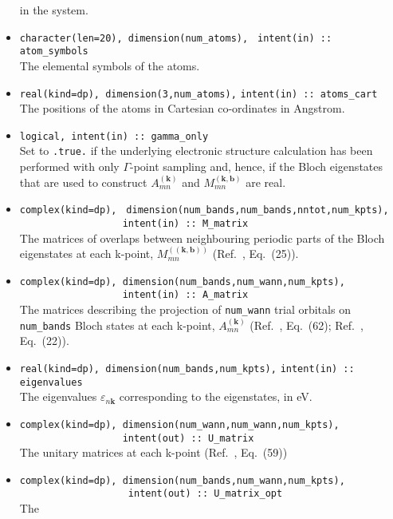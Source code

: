 \begin{itemize}
  in the system.
\item \verb#character(len=20), dimension(num_atoms),#
      \verb# intent(in) :: atom_symbols#\\ The elemental symbols of
      the atoms.
\item \verb#real(kind=dp), dimension(3,num_atoms),#
      \verb#intent(in) :: atoms_cart#\\ The positions of the atoms in
      Cartesian co-ordinates in Angstrom.
\item \verb#logical, intent(in) :: gamma_only#\\ Set to \texttt{.true.} if the
  underlying electronic structure calculation has been performed with
  only $\Gamma$-point sampling and, hence, if the Bloch eigenstates
  that are used to construct $A_{mn}^{(\mathbf{k})}$ and
  $M_{mn}^{\mathbf{(k,b)}}$ are real.
\item \verb#complex(kind=dp),#
      \verb# dimension(num_bands,num_bands,nntot,num_kpts),#\\
      \verb#                  intent(in) :: M_matrix#\\ 
      The matrices of overlaps between neighbouring periodic parts of
      the Bloch eigenstates at each k-point, $M_{mn}^{(\mathbf{(k,b)})}$
      (Ref.~\cite{MV}, Eq.~(25)).
\item \verb#complex(kind=dp), dimension(num_bands,num_wann,num_kpts),#\\
      \verb#                  intent(in) :: A_matrix# \\The matrices
      describing the projection of \verb#num_wann# trial orbitals on
      \verb#num_bands# Bloch states at each k-point,
      $A_{mn}^{(\mathbf{k})}$ (Ref.~\cite{MV}, Eq.~(62);
      Ref.~\cite{SMV}, Eq.~(22)).
\item \verb#real(kind=dp), dimension(num_bands,num_kpts),#
      \verb#intent(in) :: eigenvalues#\\ The
      eigenvalues $\varepsilon_{n\mathbf{k}}$ corresponding to the
      eigenstates, in eV.
\item \verb#complex(kind=dp), dimension(num_wann,num_wann,num_kpts),#\\
      \verb#                  intent(out) :: U_matrix#\\ The unitary
      matrices at each k-point (Ref.~\cite{MV}, Eq.~(59))
\item \verb#complex(kind=dp), dimension(num_bands,num_wann,num_kpts),#\\
      \verb#                   intent(out) :: U_matrix_opt#\\ The

\end{itemize}
